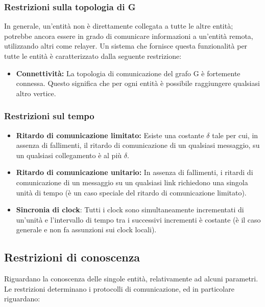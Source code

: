 \subsubsection{Restrizioni sulla topologia di G}
In generale, un'entità non è direttamente collegata a tutte le altre entità;
potrebbe ancora essere in grado di comunicare informazioni a un'entità remota,
utilizzando altri come relayer. Un sistema che fornisce questa funzionalità per
tutte le entità è caratterizzato dalla seguente restrizione:

\begin{itemize}
    \item \textbf{ Connettività:} La topologia di comunicazione del grafo G è
          fortemente connessa. Questo significa che per ogni entità è possibile
          raggiungere qualsiasi altro vertice.
\end{itemize}

\subsubsection{Restrizioni sul tempo}

\begin{itemize}
    \item \textbf{Ritardo di comunicazione limitato:} Esiste una costante $\delta$
          tale per cui, in assenza di fallimenti, il ritardo di comunicazione di un
          qualsiasi messaggio, su un qualsiasi collegamento è al più $\delta$.
    \item \textbf{Ritardo di comunicazione unitario:} In assenza di fallimenti, i
          ritardi di comunicazione di un messaggio su un qualsiasi link richiedono una
          singola unità di tempo (è un caso speciale del ritardo di comunicazione
          limitato).
    \item \textbf{Sincronia di clock}: Tutti i clock sono simultaneamente
          incrementati di un'unità e l'intervallo di tempo tra i successivi incrementi è
          costante (è il caso generale e non fa assunzioni sui clock locali).
\end{itemize}

\subsection{Restrizioni di conoscenza}
Riguardano la conoscenza delle singole entità, relativamente ad alcuni
parametri. \\
Le restrizioni determinano i protocolli di comunicazione, ed in particolare
riguardano:

